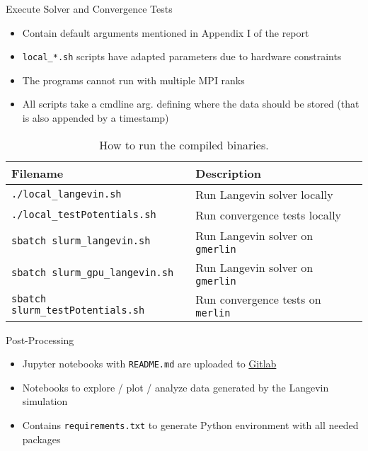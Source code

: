 \begin{frame}[c]{Execute Solver and Convergence Tests}
\begin{itemize}
    \item Contain default arguments mentioned in Appendix I of the report
    \item \texttt{local\_*.sh} scripts have adapted parameters due to hardware constraints
    \item The programs cannot run with multiple MPI ranks
    \item All scripts take a cmdline arg. defining where the data should be stored (that is also appended by a timestamp)
\end{itemize}

\begin{table}[h]
    \caption{How to run the compiled binaries.}
    \begin{tabular}[t]{l l}
        \toprule
        Filename & Description \\
        \midrule
        \texttt{./local\_langevin.sh} & Run Langevin solver locally \\
        \rule{0pt}{5ex}%
        \texttt{./local\_testPotentials.sh} & Run convergence tests locally \\
        \rule{0pt}{5ex}%
        \texttt{sbatch slurm\_langevin.sh} & Run Langevin solver on \texttt{gmerlin} \\
        \rule{0pt}{5ex}%
        \texttt{sbatch slurm\_gpu\_langevin.sh} & Run Langevin solver on \texttt{gmerlin} \\
        \rule{0pt}{5ex}%
        \texttt{sbatch slurm\_testPotentials.sh} & Run convergence tests on \texttt{merlin} \\
        \bottomrule
    \end{tabular}
    \label{table:bash_scripts_langevin}
\end{table}

\end{frame}

\begin{frame}[c]{Post-Processing}
    \begin{itemize}
        \item Jupyter notebooks with \texttt{README.md} are uploaded to
            \href{https://gitlab.psi.ch/AMAS-students/claglu-msc/-/tree/master/}{Gitlab}
        \item Notebooks to explore / plot / analyze data generated by the Langevin simulation
        \item Contains \texttt{requirements.txt} to generate Python environment with all needed
            packages
    \end{itemize}
\end{frame}



